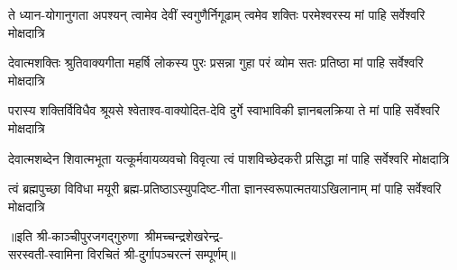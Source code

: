 

\fourlineindentedshloka
{ते ध्यान-योगानुगता अपश्यन्}
{त्वामेव देवीं स्वगुणैर्निगूढाम्}
{त्वमेव शक्तिः परमेश्वरस्य}
{मां पाहि सर्वेश्वरि मोक्षदात्रि}%

\fourlineindentedshloka
{देवात्मशक्तिः श्रुतिवाक्यगीता}
{महर्षि लोकस्य पुरः प्रसन्ना}
{गुहा परं व्योम सतः प्रतिष्ठा}
{मां पाहि सर्वेश्वरि मोक्षदात्रि}%

\fourlineindentedshloka
{परास्य शक्तिर्विविधैव श्रूयसे}
{श्वेताश्व-वाक्योदित-देवि दुर्गे}
{स्वाभाविकी ज्ञानबलक्रिया ते}
{मां पाहि सर्वेश्वरि मोक्षदात्रि}%

\fourlineindentedshloka
{देवात्मशब्देन शिवात्मभूता}
{यत्कूर्मवायव्यवचो विवृत्या}
{त्वं पाशविच्छेदकरी प्रसिद्धा}
{मां पाहि सर्वेश्वरि मोक्षदात्रि}%

\fourlineindentedshloka
{त्वं ब्रह्मपुच्छा विविधा मयूरी}
{ब्रह्म-प्रतिष्ठाऽस्युपदिष्ट-गीता}
{ज्ञानस्वरूपात्मतयाऽखिलानाम्}
{मां पाहि सर्वेश्वरि मोक्षदात्रि}%

{॥इति श्री-काञ्चीपुरजगद्गुरुणा~श्रीमच्चन्द्रशेखरेन्द्र-\\सरस्वती-स्वामिना विरचितं श्री-दुर्गापञ्चरत्नं सम्पूर्णम्॥}

